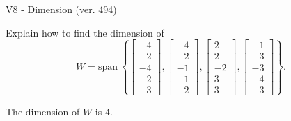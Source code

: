 \begin{exercise}
  \begin{exerciseTitle}V8 - Dimension (ver. 494)\end{exerciseTitle}
  \begin{exerciseStatement}
    Explain how to find the dimension of 
\[W=\mathrm{span}\ \left\{\left[\begin{array}{r}
-4 \\
-2 \\
-4 \\
-2 \\
-3
\end{array}\right] , \left[\begin{array}{r}
-4 \\
-2 \\
-1 \\
-1 \\
-2
\end{array}\right] , \left[\begin{array}{r}
2 \\
2 \\
-2 \\
3 \\
3
\end{array}\right] , \left[\begin{array}{r}
-1 \\
-3 \\
-3 \\
-4 \\
-3
\end{array}\right]\right\}.\]



  \end{exerciseStatement}
  \begin{exerciseAnswer}
   The dimension of \(W\) is  \(4\).
  


  \end{exerciseAnswer}
\end{exercise}